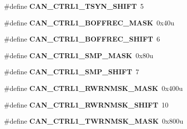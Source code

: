 \begin{DoxyCompactItemize}
\item 
\#define {\bfseries C\+A\+N\+\_\+\+C\+T\+R\+L1\+\_\+\+T\+S\+Y\+N\+\_\+\+S\+H\+I\+FT}~5\hypertarget{group__CAN__Register__Masks_gaff5bfe8a985c0511b72d2518b0bb1708}{}\label{group__CAN__Register__Masks_gaff5bfe8a985c0511b72d2518b0bb1708}

\item 
\#define {\bfseries C\+A\+N\+\_\+\+C\+T\+R\+L1\+\_\+\+B\+O\+F\+F\+R\+E\+C\+\_\+\+M\+A\+SK}~0x40u\hypertarget{group__CAN__Register__Masks_ga830ac693c34ebcc732acb2649afd87b2}{}\label{group__CAN__Register__Masks_ga830ac693c34ebcc732acb2649afd87b2}

\item 
\#define {\bfseries C\+A\+N\+\_\+\+C\+T\+R\+L1\+\_\+\+B\+O\+F\+F\+R\+E\+C\+\_\+\+S\+H\+I\+FT}~6\hypertarget{group__CAN__Register__Masks_ga0c22289dc934d1dcc577a77f1c7130a4}{}\label{group__CAN__Register__Masks_ga0c22289dc934d1dcc577a77f1c7130a4}

\item 
\#define {\bfseries C\+A\+N\+\_\+\+C\+T\+R\+L1\+\_\+\+S\+M\+P\+\_\+\+M\+A\+SK}~0x80u\hypertarget{group__CAN__Register__Masks_ga3f5256ab5fbe54468bce422ba7ee4fbf}{}\label{group__CAN__Register__Masks_ga3f5256ab5fbe54468bce422ba7ee4fbf}

\item 
\#define {\bfseries C\+A\+N\+\_\+\+C\+T\+R\+L1\+\_\+\+S\+M\+P\+\_\+\+S\+H\+I\+FT}~7\hypertarget{group__CAN__Register__Masks_ga51311c5bddb44be7525e317cde09d9b4}{}\label{group__CAN__Register__Masks_ga51311c5bddb44be7525e317cde09d9b4}

\item 
\#define {\bfseries C\+A\+N\+\_\+\+C\+T\+R\+L1\+\_\+\+R\+W\+R\+N\+M\+S\+K\+\_\+\+M\+A\+SK}~0x400u\hypertarget{group__CAN__Register__Masks_ga5f1140aae7ce80eb8ee0793c3171f841}{}\label{group__CAN__Register__Masks_ga5f1140aae7ce80eb8ee0793c3171f841}

\item 
\#define {\bfseries C\+A\+N\+\_\+\+C\+T\+R\+L1\+\_\+\+R\+W\+R\+N\+M\+S\+K\+\_\+\+S\+H\+I\+FT}~10\hypertarget{group__CAN__Register__Masks_gaaaa2935c6f8490bc19c7514f9a3eea5c}{}\label{group__CAN__Register__Masks_gaaaa2935c6f8490bc19c7514f9a3eea5c}

\item 
\#define {\bfseries C\+A\+N\+\_\+\+C\+T\+R\+L1\+\_\+\+T\+W\+R\+N\+M\+S\+K\+\_\+\+M\+A\+SK}~0x800u\hypertarget{group__CAN__Register__Masks_ga87f6ef900cc1d1a39b28eb8ac2a47493}{}\label{group__CAN__Register__Masks_ga87f6ef900cc1d1a39b28eb8ac2a47493}


\end{DoxyCompactItemize}

